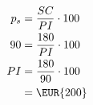 	\begin{align*}
		p_s={}&\dfrac{SC}{PI}\cdot 100\\
		90={}&\dfrac{180}{PI}\cdot 100\\
		PI={}&\dfrac{180}{90}\cdot 100\\
		={}&\mbox{\EUR{200}}
	\end{align*}
